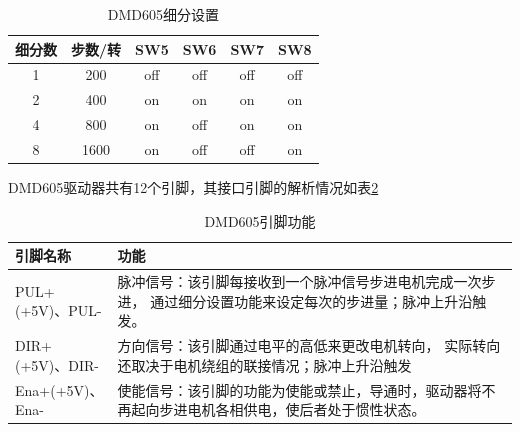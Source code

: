 \begin{table}[htbp]
	\centering
	\caption{DMD605细分设置}
	\begin{tabular}{cccccc}
		\toprule
		\toprule
		细分数  & 步数/转  &	SW5  & SW6  & SW7  & SW8 \\
		\midrule
		1  & 200  &  off  & off  & off  & off  \\
		2  & 400  & on  & on  & on  & on \\
		4  & 800  & on  & off & on  & on \\
		8  & 1600  & on  & off  & off  & on  \\
		\bottomrule
		\bottomrule
	\end{tabular}%
	\label{tab:5-1}%
\end{table}%

DMD605驱动器共有12个引脚，其接口引脚的解析情况如表\ref{tab:5-2}
\begin{table}[htbp]
	\centering
	\caption{DMD605引脚功能}
	\begin{tabular}{p{80pt}p{250pt}}
		\toprule
		\toprule
		引脚名称  & 功能 \\
		\midrule
		PUL+(+5V)、PUL-  & 脉冲信号：该引脚每接收到一个脉冲信号步进电机完成一次步进， 通过细分设置功能来设定每次的步进量；脉冲上升沿触发。 \\
		DIR+(+5V)、DIR- & 方向信号：该引脚通过电平的高低来更改电机转向， 实际转向还取决于电机绕组的联接情况；脉冲上升沿触发\\ 
		Ena+(+5V)、Ena-  & 使能信号：该引脚的功能为使能或禁止，导通时，驱动器将不再起向步进电机各相供电，使后者处于惯性状态。 \\
		\bottomrule
		\bottomrule
	\end{tabular}%
	\label{tab:5-2}%
\end{table}


